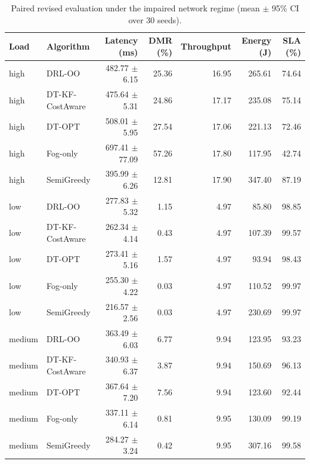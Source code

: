 \begin{table}[t]
\centering
\caption{Paired revised evaluation under the impaired network regime (mean $\pm$ 95\% CI over 30 seeds).}
\label{tab:qos_ai_revised}
\begin{tabular}{llrrrrr}
\toprule
Load & Algorithm & Latency (ms) & DMR (\%) & Throughput & Energy (J) & SLA (\%) \\
\midrule
high & DRL-OO & 482.77 $\pm$ 6.15 & 25.36 & 16.95 & 265.61 & 74.64 \\
high & DT-KF-CostAware & 475.64 $\pm$ 5.31 & 24.86 & 17.17 & 235.08 & 75.14 \\
high & DT-OPT & 508.01 $\pm$ 5.95 & 27.54 & 17.06 & 221.13 & 72.46 \\
high & Fog-only & 697.41 $\pm$ 77.09 & 57.26 & 17.80 & 117.95 & 42.74 \\
high & SemiGreedy & 395.99 $\pm$ 6.26 & 12.81 & 17.90 & 347.40 & 87.19 \\
low & DRL-OO & 277.83 $\pm$ 5.32 & 1.15 & 4.97 & 85.80 & 98.85 \\
low & DT-KF-CostAware & 262.34 $\pm$ 4.14 & 0.43 & 4.97 & 107.39 & 99.57 \\
low & DT-OPT & 273.41 $\pm$ 5.16 & 1.57 & 4.97 & 93.94 & 98.43 \\
low & Fog-only & 255.30 $\pm$ 4.22 & 0.03 & 4.97 & 110.52 & 99.97 \\
low & SemiGreedy & 216.57 $\pm$ 2.56 & 0.03 & 4.97 & 230.69 & 99.97 \\
medium & DRL-OO & 363.49 $\pm$ 6.03 & 6.77 & 9.94 & 123.95 & 93.23 \\
medium & DT-KF-CostAware & 340.93 $\pm$ 6.37 & 3.87 & 9.94 & 150.69 & 96.13 \\
medium & DT-OPT & 367.64 $\pm$ 7.20 & 7.56 & 9.94 & 123.60 & 92.44 \\
medium & Fog-only & 337.11 $\pm$ 6.14 & 0.81 & 9.95 & 130.09 & 99.19 \\
medium & SemiGreedy & 284.27 $\pm$ 3.24 & 0.42 & 9.95 & 307.16 & 99.58 \\
\bottomrule
\end{tabular}
\end{table}
